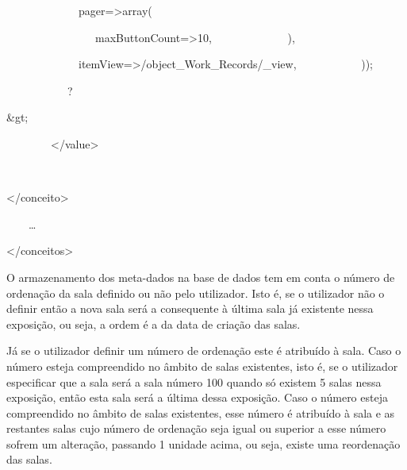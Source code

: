 \documentclass[letterpaper]{article}
\begin{document}
{{\ \ \ \ \ \ \ \ \ \ \ \ \ {\textquotesingle}pager{\textquotesingle}={\textgreater}array(\newline

\ \ \ \ \ \ \ \ \ \ \ \ \ \ \ \ {\textquotesingle}maxButtonCount{\textquotesingle}={\textgreater}{\textquotesingle}10{\textquotesingle},\newline
 \ \ \ \ \ \ \ \ \ \ \ \ \ ),\newline

\ \ \ \ \ \ \ \ \ \ \ \ \ {\textquotesingle}itemView{\textquotesingle}={\textgreater}{\textquotesingle}/object\_Work\_Records/\_view{\textquotesingle},\newline
 \ \ \ \ \ \ \ \ \ \ \ ));\newline

\ \ \ \ \ \ \ \ \ \ \ ?}\textcolor[rgb]{0.5882353,0.5882353,0.0}{\&gt;}}

{
\textcolor[rgb]{0.5882353,0.5882353,0.0}{\ \ \ \ \ \ \ \ }\textcolor[rgb]{0.0,0.0,0.5882353}{{\textless}/value{\textgreater}}\textcolor{black}{\newline

\ \ \ }\textcolor[rgb]{0.0,0.0,0.5882353}{{\textless}/conceito{\textgreater}}}

{\color[rgb]{0.0,0.0,0.5882353}
\ \ \ \ {\dots}}

{\color[rgb]{0.0,0.0,0.5882353}
{\textless}/conceitos{\textgreater}}


\bigskip

{
O armazenamento dos meta-dados na base de dados tem em conta o n\'umero
de ordena\c{c}\~ao da sala definido ou n\~ao pelo utilizador. Isto \'e,
se o utilizador n\~ao o definir ent\~ao a nova sala ser\'a a
consequente \`a \'ultima sala j\'a existente nessa exposi\c{c}\~ao, ou
seja, a ordem \'e a da data de cria\c{c}\~ao das salas. }

{
J\'a se o utilizador definir um n\'umero de ordena\c{c}\~ao este \'e
atribu\'ido \`a sala. Caso o n\'umero esteja compreendido no \^ambito
de salas existentes, isto \'e, se o utilizador especificar que a sala
ser\'a a sala n\'umero 100 quando s\'o existem 5 salas nessa
exposi\c{c}\~ao, ent\~ao esta sala ser\'a a \'ultima dessa
exposi\c{c}\~ao. Caso o n\'umero esteja compreendido no \^ambito de
salas existentes, esse n\'umero \'e atribu\'ido \`a sala e as restantes
salas cujo n\'umero de ordena\c{c}\~ao seja igual ou superior a esse
n\'umero sofrem um altera\c{c}\~ao, passando 1 unidade acima, ou seja,
existe uma reordena\c{c}\~ao das salas.}
\end{document}
